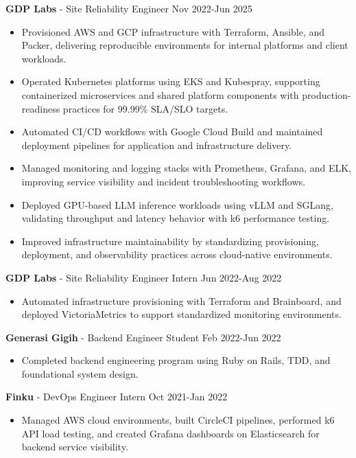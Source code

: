\documentclass[10pt,a4paper]{article}
\begin{document}
\textbf{GDP Labs} - Site Reliability Engineer \hfill Nov 2022-Jun 2025

\begin{itemize}[leftmargin=*]
  \item Provisioned AWS and GCP infrastructure with Terraform, Ansible, and Packer, delivering reproducible environments for internal platforms and client workloads.
  \item Operated Kubernetes platforms using EKS and Kubespray, supporting containerized microservices and shared platform components with production-readiness practices for 99.99\% SLA/SLO targets.
  \item Automated CI/CD workflows with Google Cloud Build and maintained deployment pipelines for application and infrastructure delivery.
  \item Managed monitoring and logging stacks with Prometheus, Grafana, and ELK, improving service visibility and incident troubleshooting workflows.
  \item Deployed GPU-based LLM inference workloads using vLLM and SGLang, validating throughput and latency behavior with k6 performance testing.
  \item Improved infrastructure maintainability by standardizing provisioning, deployment, and observability practices across cloud-native environments.
\end{itemize}

\textbf{GDP Labs} - Site Reliability Engineer Intern \hfill Jun 2022-Aug 2022

\begin{itemize}[leftmargin=*]
  \item Automated infrastructure provisioning with Terraform and Brainboard, and deployed VictoriaMetrics to support standardized monitoring environments.
\end{itemize}

\textbf{Generasi Gigih} - Backend Engineer Student \hfill Feb 2022-Jun 2022

\begin{itemize}[leftmargin=*]
  \item Completed backend engineering program using Ruby on Rails, TDD, and foundational system design.
\end{itemize}

\textbf{Finku} - DevOps Engineer Intern \hfill Oct 2021-Jan 2022

\begin{itemize}[leftmargin=*]
  \item Managed AWS cloud environments, built CircleCI pipelines, performed k6 API load testing, and created Grafana dashboards on Elasticsearch for backend service visibility.
\end{itemize}
\end{document}

